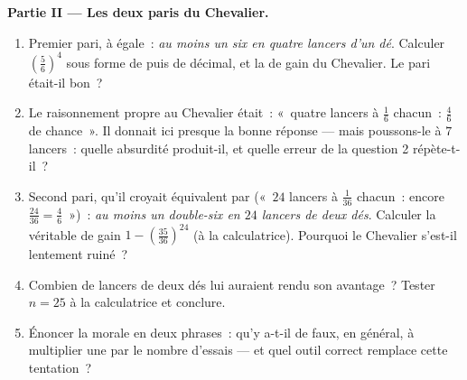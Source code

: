 \begin{problem}
\medskip
\noindent\textbf{Partie II --- Les deux paris du Chevalier.}
\begin{enumerate}[resume]
  \item Premier pari, à  égale~: \emph{au moins un six en
        quatre lancers d'un dé}. Calculer
        $\left(\frac56\right)^4$ sous forme de  puis de
        décimal, et la  de gain du Chevalier. Le pari
        était-il bon~?
  \item Le raisonnement propre au Chevalier était~: «~quatre lancers
        à $\frac16$ chacun~: $\frac46$ de chance~». Il donnait ici
        presque la bonne réponse --- mais poussons-le à $7$
        lancers~: quelle absurdité produit-il, et quelle erreur de
        la question 2 répète-t-il~?
  \item Second pari, qu'il croyait équivalent par 
        («~$24$ lancers à $\frac1{36}$ chacun~: encore
        $\frac{24}{36} = \frac46$~»)~: \emph{au moins un double-six
        en $24$ lancers de deux dés}. Calculer la véritable
         de gain $1 - \left(\frac{35}{36}\right)^{24}$
        (à la calculatrice). Pourquoi le Chevalier s'est-il
        lentement ruiné~?
  \item Combien de lancers de deux dés lui auraient rendu son
        avantage~? Tester $n = 25$ à la calculatrice et conclure.
  \item Énoncer la morale en deux phrases~: qu'y a-t-il de faux, en
        général, à multiplier une  par le nombre
        d'essais --- et quel outil correct remplace cette
        tentation~?
\end{enumerate}


\end{problem}
